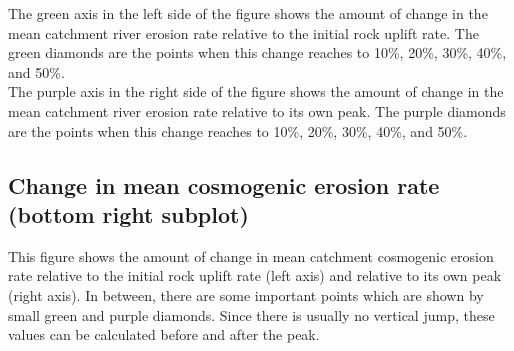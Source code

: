 \documentclass[11pt,a4paper,titlepage]{report}
\begin{document}
The green axis in the left side of the figure shows the amount of change in the mean catchment river erosion rate relative to the initial rock uplift rate. The green diamonds are the points when this change reaches to 10\%, 20\%, 30\%, 40\%, and 50\%.\\

The purple axis in the right side of the figure shows the amount of change in the mean catchment river erosion rate relative to its own peak. The purple diamonds are the points when this change reaches to 10\%, 20\%, 30\%, 40\%, and 50\%.\\

\subsection{Change in mean cosmogenic erosion rate (bottom right subplot)}
This figure shows the amount of change in mean catchment cosmogenic erosion rate relative to the initial rock uplift rate (left axis) and relative to its own peak (right axis). In between, there are some important points which are shown by small green and purple diamonds. Since there is usually no vertical jump, these values can be calculated before and after the peak.
\end{document}
